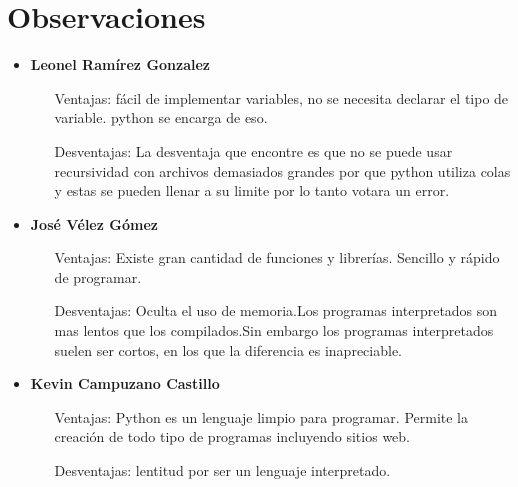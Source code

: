 \documentclass[a4paper,openright,12pt]{report}
\begin{document}
\chapter{Observaciones}
\begin{itemize}
\item \textbf{Leonel Ramírez Gonzalez}
\begin{itemize}
	\item[Ventajas: ]fácil de implementar variables, no se necesita declarar el tipo de variable.
python se encarga de eso.
	\item[Desventajas: ]La desventaja que encontre es que no se puede usar recursividad con archivos demasiados grandes por que python utiliza colas y estas se pueden llenar a su limite por lo tanto votara un error.
\end{itemize}
\item \textbf{José Vélez Gómez}
\begin{itemize}
	\item[Ventajas: ]Existe gran cantidad de funciones y librerías. Sencillo y rápido de programar.
	\item[Desventajas: ]Oculta el uso de memoria.Los programas interpretados son mas lentos que los compilados.Sin
embargo los programas interpretados suelen ser cortos, en los que la diferencia es inapreciable.
\end{itemize}
\item \textbf{Kevin Campuzano Castillo}
\begin{itemize}
	\item[Ventajas: ]Python es un lenguaje limpio para programar. Permite la creación de todo tipo de programas incluyendo sitios web.
	\item[Desventajas: ] lentitud por ser un lenguaje interpretado.
\end{itemize}
\end{itemize}
\end{document}
